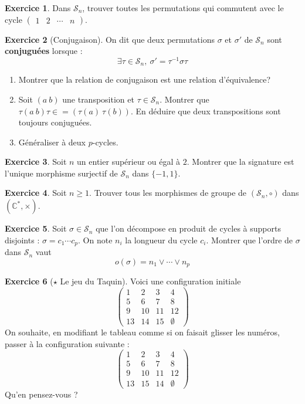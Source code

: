 \documentclass[french]{book}
\newcommand{\C}{\mathbb{C}}
\newcommand{\st}{^*}
\newcommand{\inv}{^{-1}}
\theoremstyle{definition}
\newtheorem{ex}{Exercice}[chapter]
\theoremstyle{theorem}
\theoremstyle{remark}
\begin{document}
\begin{ex}
	Dans $\mathcal{S}_n$, trouver toutes les permutations qui commutent avec le cycle $\begin{pmatrix}
		1&2&\cdots&n
	\end{pmatrix}$.
\end{ex}

\begin{ex}[Conjugaison]
	On dit que deux permutations $\sigma$ et $\sigma'$ de $\mathcal{S}_n$ sont \textbf{conjuguées} lorsque : $$\exists\tau\in\mathcal{S}_n,\ \sigma'=\tau\inv\sigma\tau$$
	\begin{enumerate}
		\item Montrer que la relation de conjugaison est une relation d'équivalence?
		\item Soit $(a\ b)$ une transposition et $\tau\in\mathcal{S}_n$. Montrer que $\tau(a\ b)\tau\in=(\tau(a)\ \tau(b))$. En déduire que deux transpositions sont toujours conjuguées.
		\item Généraliser à deux $p$-cycles.
	\end{enumerate}
\end{ex}

\begin{ex}
	Soit $n$ un entier supérieur ou égal à $2$. Montrer que la signature est l'unique morphisme surjectif de $\mathcal{S}_n$ dans $\{-1,1\}$.
\end{ex}

\begin{ex}
	Soit $n\geqslant 1$. Trouver tous les morphismes de groupe de $(\mathcal{S}_n,\circ)$ dans $(\C\st,\times)$.
\end{ex}

\begin{ex}
	Soit $\sigma\in\mathcal{S}_n$ que l'on décompose en produit de cycles à supports disjoints : $\sigma=c_1\cdots c_p$. On note $n_i$ la longueur du cycle $c_i$. Montrer que l'ordre de $\sigma$ dans $\mathcal{S}_n$ vaut $$o(\sigma)=n_1\vee\cdots\vee n_p$$
\end{ex}

\begin{ex}[$\star$ Le jeu du Taquin]
	Voici une configuration initiale $$\begin{pmatrix}
		1&2&3&4\\
		5&6&7&8\\
		9&10&11&12\\
		13&14&15&\emptyset
	\end{pmatrix}$$ On souhaite, en modifiant le tableau comme si on faisait glisser les numéros, passer à la configuration suivante : $$\begin{pmatrix}
	1&2&3&4\\
	5&6&7&8\\
	9&10&11&12\\
	13&15&14&\emptyset
	\end{pmatrix}$$ Qu'en pensez-vous ?
\end{ex}
\end{document}
